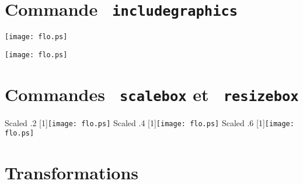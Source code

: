 \documentclass{article}
\begin{document}
\section{Commande \texttt{ includegraphics}}
\begin{center}
\texttt{[image: flo.ps]}
\end{center}


\texttt{[image: flo.ps]}


\section{Commandes \texttt{ scalebox} et \texttt{ resizebox}}

\begin{center}
\end{center}

Scaled .2 \scalebox{.2}[1]{\texttt{[image: flo.ps]}}
Scaled .4 \scalebox{.4}[1]{\texttt{[image: flo.ps]}}
Scaled .6 \scalebox{.6}[1]{\texttt{[image: flo.ps]}}


\section{Transformations}



\end{document}

